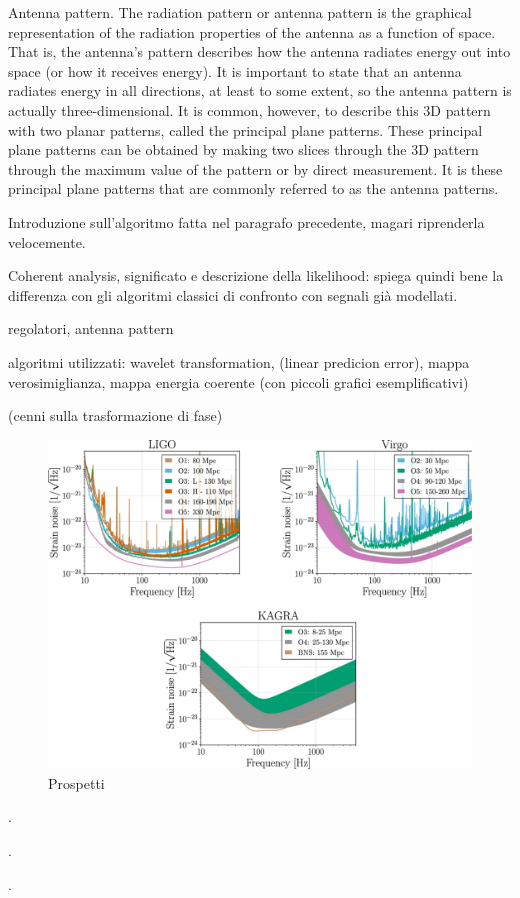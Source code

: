 Antenna pattern. The radiation pattern or antenna pattern is the graphical representation of the radiation properties of the antenna as a function of space. That is, the antenna's pattern describes how the antenna radiates energy out into space (or how it receives energy). It is important to state that an antenna radiates energy in all directions, at least to some extent, so the antenna pattern is actually three-dimensional. It is common, however, to describe this 3D pattern with two planar patterns, called the principal plane patterns. These principal plane patterns can be obtained by making two slices through the 3D pattern through the maximum value of the pattern or by direct measurement. It is these principal plane patterns that are commonly referred to as the antenna patterns. 

Introduzione sull'algoritmo fatta nel paragrafo precedente, magari riprenderla velocemente.

Coherent analysis, significato e descrizione della likelihood: spiega quindi bene la differenza con gli algoritmi classici di confronto con segnali già modellati.

regolatori, antenna pattern

algoritmi utilizzati: wavelet transformation, (linear predicion error), mappa verosimiglianza, mappa energia coerente (con piccoli grafici esemplificativi)

(cenni sulla trasformazione di fase)

\begin{center}
	\begin{figure}[ht]
		\centering
		\includegraphics[scale=0.25, angle=0]{figures/Capitolo_3/noiseO4.pdf}
		\setlength{\belowcaptionskip}{-20pt}
		\caption{Prospetti \cite{Abbott_2020a}}
		\label{fig:noiseO4}
	\end{figure}
\end{center}

\lipsum[3]\cite{Abbott_2017a}.

\lipsum[4]\cite{Klimenko_2008}.

\lipsum[6]\cite{Klimenko_2016}.
